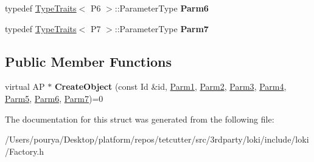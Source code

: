\begin{DoxyCompactItemize}
\item 
\hypertarget{structLoki_1_1FactoryImpl_3_01AP_00_01Id_00_01LOKI__TYPELIST__7_07P1_00_01P2_00_01P3_00_01P4_00_01P5_00_01P6_00_01P7_08_4_a79fc2d08a9f44aa5a5fcb1352a3ccbdf}{}typedef \hyperlink{classLoki_1_1TypeTraits}{Type\+Traits}$<$ P6 $>$\+::Parameter\+Type {\bfseries Parm6}\label{structLoki_1_1FactoryImpl_3_01AP_00_01Id_00_01LOKI__TYPELIST__7_07P1_00_01P2_00_01P3_00_01P4_00_01P5_00_01P6_00_01P7_08_4_a79fc2d08a9f44aa5a5fcb1352a3ccbdf}

\item 
\hypertarget{structLoki_1_1FactoryImpl_3_01AP_00_01Id_00_01LOKI__TYPELIST__7_07P1_00_01P2_00_01P3_00_01P4_00_01P5_00_01P6_00_01P7_08_4_a37301ac210b5c73d5b093496452a2e84}{}typedef \hyperlink{classLoki_1_1TypeTraits}{Type\+Traits}$<$ P7 $>$\+::Parameter\+Type {\bfseries Parm7}\label{structLoki_1_1FactoryImpl_3_01AP_00_01Id_00_01LOKI__TYPELIST__7_07P1_00_01P2_00_01P3_00_01P4_00_01P5_00_01P6_00_01P7_08_4_a37301ac210b5c73d5b093496452a2e84}

\end{DoxyCompactItemize}
\subsection*{Public Member Functions}
\begin{DoxyCompactItemize}
\item 
\hypertarget{structLoki_1_1FactoryImpl_3_01AP_00_01Id_00_01LOKI__TYPELIST__7_07P1_00_01P2_00_01P3_00_01P4_00_01P5_00_01P6_00_01P7_08_4_a8405aa523fd6f0372b1973083481d246}{}virtual A\+P $\ast$ {\bfseries Create\+Object} (const Id \&id, \hyperlink{classLoki_1_1EmptyType}{Parm1}, \hyperlink{classLoki_1_1EmptyType}{Parm2}, \hyperlink{classLoki_1_1EmptyType}{Parm3}, \hyperlink{classLoki_1_1EmptyType}{Parm4}, \hyperlink{classLoki_1_1EmptyType}{Parm5}, \hyperlink{classLoki_1_1EmptyType}{Parm6}, \hyperlink{classLoki_1_1EmptyType}{Parm7})=0\label{structLoki_1_1FactoryImpl_3_01AP_00_01Id_00_01LOKI__TYPELIST__7_07P1_00_01P2_00_01P3_00_01P4_00_01P5_00_01P6_00_01P7_08_4_a8405aa523fd6f0372b1973083481d246}

\end{DoxyCompactItemize}


The documentation for this struct was generated from the following file\+:\begin{DoxyCompactItemize}
\item 
/\+Users/pourya/\+Desktop/platform/repos/tetcutter/src/3rdparty/loki/include/loki/Factory.\+h\end{DoxyCompactItemize}
